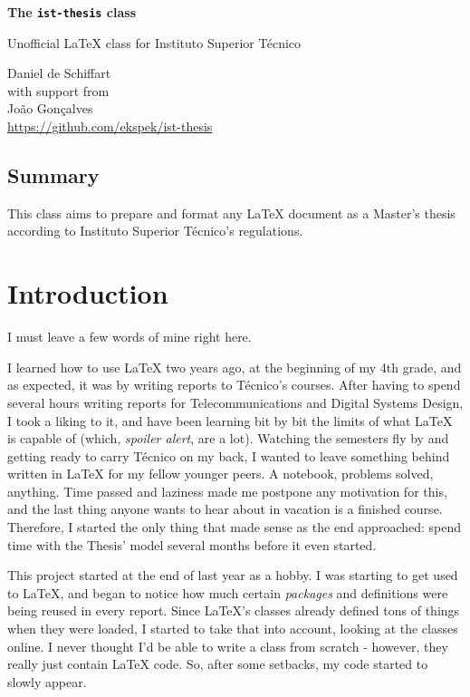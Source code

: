 \documentclass[english]{../ist-thesis}
\begin{document}
\begin{center}
	{\Huge\bfseries The \texttt{ist-thesis} class}
	\par\bigskip
	{\Large Unofficial \LaTeX{} class for Instituto Superior Técnico}
	\par\bigskip\smallskip
	Daniel de Schiffart \\
	{\small with support from} \\
	{João Gonçalves \\}
	\url{https://github.com/ekspek/ist-thesis}
\end{center}

\bigskip\bigskip

\begin{center}
	\section*{Summary}
\end{center}
This class aims to prepare and format any \LaTeX{} document as a Master's thesis according to Instituto Superior Técnico's regulations.

\tableofcontents

\clearpage

\section*{Introduction}

I must leave a few words of mine right here.

I learned how to use \LaTeX{} two years ago, at the beginning of my 4th grade, and as expected, it was by writing reports to Técnico's courses. After having to spend several hours writing reports for Telecommunications and Digital Systems Design, I took a liking to it, and have been learning bit by bit the limits of what \LaTeX{} is capable of (which, \textit{spoiler alert}, are a lot). Watching the semesters fly by and getting ready to carry Técnico on my back, I wanted to leave something behind written in \LaTeX{} for my fellow younger peers. A notebook, problems solved, anything. Time passed and laziness made me postpone any motivation for this, and the last thing anyone wants to hear about in vacation is a finished course. Therefore, I started the only thing that made sense as the end approached: spend time with the Thesis' model several months before it even started.


This project started at the end of last year as a hobby. I was starting to get used to \LaTeX{}, and began to notice how much certain \textit{packages} and  definitions were being reused in every report. Since \LaTeX{}'s classes already defined tons of things when they were loaded, I started to take that into account, looking at the classes online. I never thought I'd be able to write a class from scratch - however, they really just contain \LaTeX{} code. So, after some setbacks, my code started to slowly appear.
\end{document}
